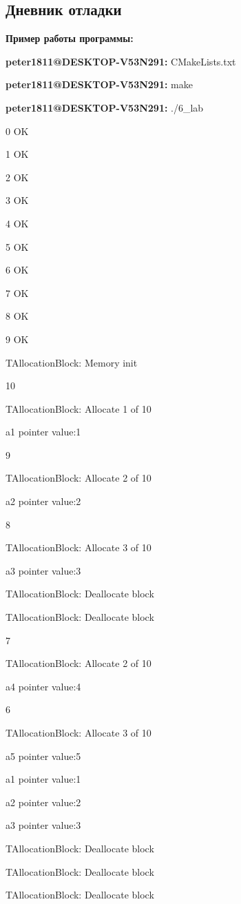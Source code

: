 \documentclass[12pt]{article}
\begin{document}
\subsection*{Дневник отладки}

\begin{left}

\textbf{Пример работы программы: }

\textbf{peter1811@DESKTOP-V53N291:}  CMakeLists.txt
    
\textbf{peter1811@DESKTOP-V53N291:} make
    
\textbf{peter1811@DESKTOP-V53N291:} ./6\_lab

0 OK

1 OK

2 OK

3 OK

4 OK

5 OK

6 OK

7 OK

8 OK

9 OK

TAllocationBlock: Memory init

10

TAllocationBlock: Allocate 1 of 10

a1 pointer value:1

9

TAllocationBlock: Allocate 2 of 10

a2 pointer value:2

8

TAllocationBlock: Allocate 3 of 10

a3 pointer value:3

TAllocationBlock: Deallocate block

TAllocationBlock: Deallocate block

7

TAllocationBlock: Allocate 2 of 10

a4 pointer value:4

6

TAllocationBlock: Allocate 3 of 10

a5 pointer value:5

a1 pointer value:1

a2 pointer value:2

a3 pointer value:3

TAllocationBlock: Deallocate block

TAllocationBlock: Deallocate block

TAllocationBlock: Deallocate block


\end{left}
\end{document}
